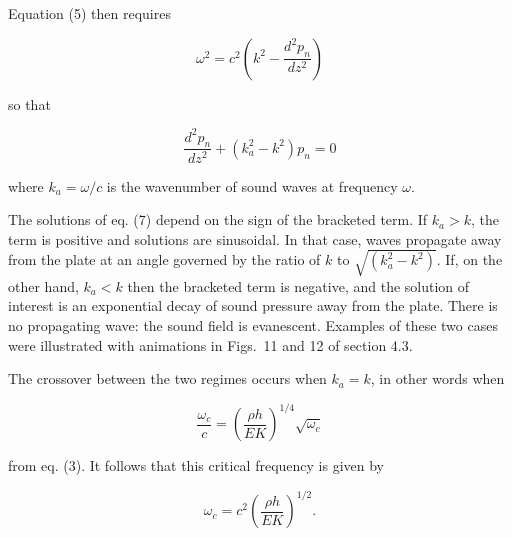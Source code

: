   Equation (5) then requires 

  \begin{equation*}\omega^2 = c^2\left( k^2 -\frac{d^2 p_n}{d z^2} 
  \right)\end{equation*} 

  \noindent{}so that 

  \begin{equation*}\frac{d^2 p_n}{d z^2} + (k_a^2-k^2) p_n =0 
  \tag{7}\end{equation*} 

  \noindent{}where $k_a=\omega/c$ is the wavenumber of sound waves at frequency 
  $\omega$. 

  The solutions of eq. (7) depend on the sign of the bracketed term. If $k_a > 
  k$, the term is positive and solutions are sinusoidal. In that case, waves 
  propagate away from the plate at an angle governed by the ratio of $k$ to 
  $\sqrt{(k_a^2-k^2)}$. If, on the other hand, $k_a < k$ then the bracketed 
  term is negative, and the solution of interest is an exponential decay of 
  sound pressure away from the plate. There is no propagating wave: the sound 
  field is evanescent. Examples of these two cases were illustrated with 
  animations in Figs.\ 11 and 12 of section 4.3. 

  The crossover between the two regimes occurs when $k_a = k$, in other words 
  when 

  \begin{equation*}\frac{\omega_c}{c} = \left( \dfrac{\rho h}{EK} \right)^{1/4} 
  \sqrt{\omega_c} \tag{8}\end{equation*} 

  \noindent{}from eq. (3). It follows that this critical frequency is given by 

  \begin{equation*}\omega_c = c^2 \left( \dfrac{\rho h}{EK} \right)^{1/2} . 
  \tag{9}\end{equation*} 